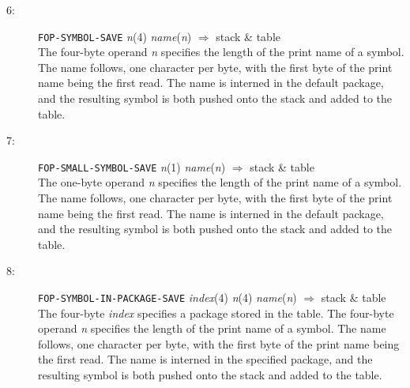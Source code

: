 \begin{description}
\item[6:] \hspace{2em} {\tt FOP-SYMBOL-SAVE} \hspace{2em} {\it n}(4) \hspace{2em} {\it name}({\it n})
\hspace{2em} $\Rightarrow$ \hspace{2em} stack \& table\\
The four-byte operand {\it n} specifies the length of the print name
of a symbol.  The name follows, one character per byte,
with the first byte of the print name being the first read.
The name is interned in the default package,
and the resulting symbol is both pushed onto the stack and added to the table.

\item[7:] \hspace{2em} {\tt FOP-SMALL-SYMBOL-SAVE} \hspace{2em} {\it n}(1) \hspace{2em} {\it name}({\it n}) \hspace{2em} $\Rightarrow$ \hspace{2em} stack \& table\\
The one-byte operand {\it n} specifies the length of the print name
of a symbol.  The name follows, one character per byte,
with the first byte of the print name being the first read.
The name is interned in the default package,
and the resulting symbol is both pushed onto the stack and added to the table.

\item[8:] \hspace{2em} {\tt FOP-SYMBOL-IN-PACKAGE-SAVE} \hspace{2em} {\it index}(4)
\hspace{2em} {\it n}(4) \hspace{2em} {\it name}({\it n})
\hspace{2em} $\Rightarrow$ \hspace{2em} stack \& table\\
The four-byte {\it index} specifies a package stored in the table.
The four-byte operand {\it n} specifies the length of the print name
of a symbol.  The name follows, one character per byte,
with the first byte of the print name being the first read.
The name is interned in the specified package,
and the resulting symbol is both pushed onto the stack and added to the table.


\end{description}
